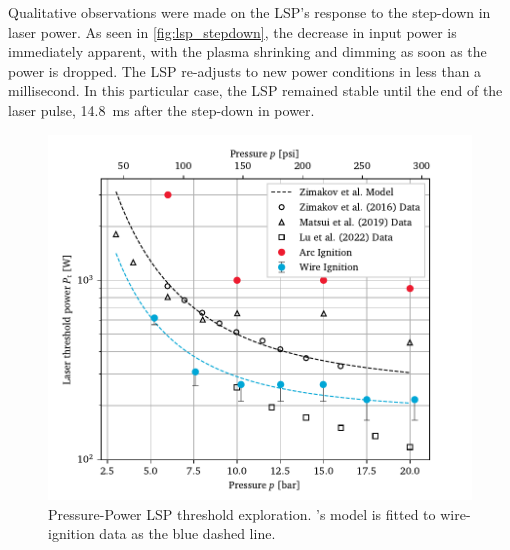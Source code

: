             Qualitative observations were made on the LSP's response to the step-down in laser power. As seen in \autoref{fig:lsp_stepdown}, the decrease in input power is immediately apparent, with the plasma shrinking and dimming as soon as the power is dropped. The LSP re-adjusts to new power conditions in less than a millisecond. In this particular case, the LSP remained stable until the end of the laser pulse, \qty{14.8}{ms} after the step-down in power.


            \begin{figure}[h]
                \centering
                \includegraphics[]{assets/5 results/powerthreshold}
                \caption[Pressure-Power LSP threshold exploration]{Pressure-Power LSP threshold exploration. \textcite{zimakovInteractionNearIRLaser2016}'s model is fitted to wire-ignition data as the blue dashed line.}
                \label{fig:powerthreshold}
            \end{figure}

